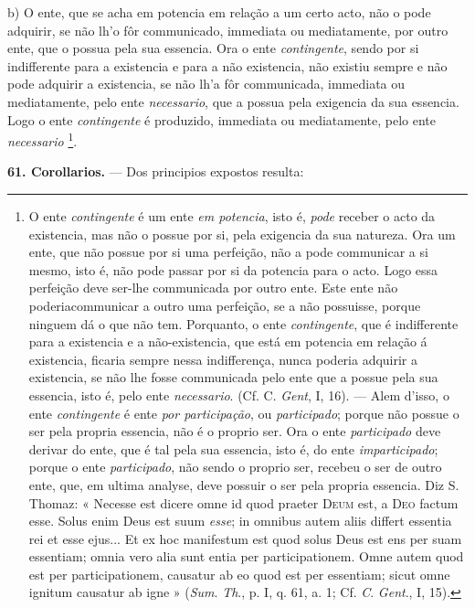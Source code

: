 b) O ente, que se acha em potencia em relação a um certo acto, não o pode adquirir, se não lh'o fôr communicado, immediata ou mediatamente, por outro ente, que o possua pela sua essencia. Ora o ente \emph{contingente}, sendo por si indifferente para a existencia e para a não existencia, não existiu sempre e não pode adquirir a existencia, se não lh'a fôr communicada, immediata ou mediatamente, pelo ente \emph{necessario}, que a possua pela exigencia da sua essencia. Logo o ente \emph{contingente} é produzido, immediata ou mediatamente, pelo ente \emph{necessario} \footnote{O ente \emph{contingente} é um ente \emph{em potencia}, isto é, \emph{pode} receber o acto da existencia, mas não o possue por si, pela exigencia da sua natureza. Ora um ente, que não possue por si uma perfeição, não a pode communicar a si mesmo, isto é, não pode passar por si da potencia para o acto. Logo essa perfeição deve ser-lhe communicada por outro ente. Este ente não poderiacommunicar a outro uma perfeição, se a não possuisse, porque ninguem dá o que não tem. Porquanto, o ente \emph{contingente}, que é indifferente para a existencia e a não-existencia, que está em potencia em relação á existencia, ficaria sempre nessa indifferença, nunca poderia adquirir a existencia, se não lhe fosse communicada pelo ente que a possue pela sua essencia, isto é, pelo ente \emph{necessario}. (Cf. C. \emph{Gent}, I, 16). --- Alem d'isso, o ente \emph{contingente} é ente \emph{por participação}, ou \emph{participado}; porque não possue o ser pela propria essencia, não é o proprio ser. Ora o ente \emph{participado} deve derivar do ente, que é tal pela sua essencia, isto é, do ente \emph{imparticipado}; porque o ente \emph{participado}, não sendo o proprio ser, recebeu o ser de outro ente, que, em ultima analyse, deve possuir o ser pela propria essencia. Diz S. Thomaz: « Necesse est dicere omne id quod praeter \textsc{Deum} est, a \textsc{Deo} factum esse. Solus enim Deus est suum \emph{esse}; in omnibus autem aliis differt essentia rei et esse ejus... Et ex hoc manifestum est quod solus Deus est ens per suam essentiam; omnia vero alia sunt entia per participationem. Omne autem quod est per participationem, causatur ab eo quod est per essentiam; sicut omne ignitum causatur ab igne » (\emph{Sum}. \emph{Th}., p. I, q. 61, a. 1; Cf. \emph{C}. \emph{Gent}., I, 15).}.

 \textbf{61. Corollarios.} --- Dos principios expostos resulta:

